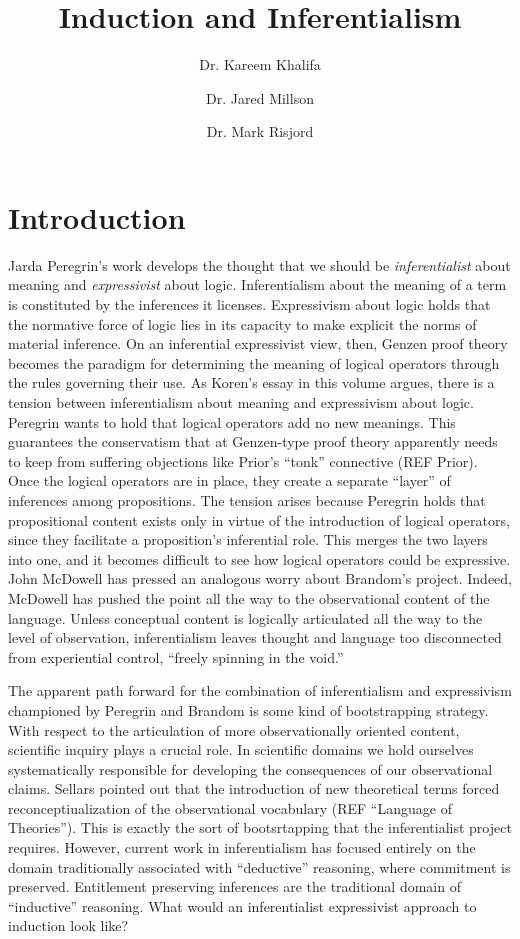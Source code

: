 \documentclass{article}                     %
\title{Induction and Inferentialism}
\author{							
	Dr. Kareem Khalifa  \and
	Dr. Jared Millson   \and
	Dr. Mark Risjord
	}
\date{}
\begin{document}
\maketitle
\large
\doublespacing   %

\section{Introduction}

Jarda Peregrin's work develops the thought that we should be \textit{inferentialist} about meaning and \textit{expressivist} about logic.  Inferentialism about the meaning of a term is constituted by the inferences it licenses.  Expressivism about logic holds that the normative force of logic lies in its capacity to make explicit the norms of material inference. On an inferential expressivist view, then, Genzen proof theory becomes the paradigm for determining the meaning of logical operators through the rules governing their use.  As Koren's essay in this volume argues, there is a tension between inferentialism about meaning and expressivism about logic.  Peregrin wants to hold that logical operators add no new meanings.  This guarantees the conservatism that at Genzen-type proof theory apparently needs to keep from suffering objections like Prior's ``tonk'' connective (REF Prior).   Once the logical operators are in place, they create a separate ``layer'' of inferences among propositions.  The tension arises because Peregrin holds that propositional content exists only in virtue of the introduction of logical operators, since they facilitate a proposition's inferential role.  This merges the two layers into one, and it becomes difficult to see how logical operators could be expressive.  John McDowell has pressed an analogous worry about Brandom's project.  Indeed, McDowell has pushed the point all the way to the observational content of the language.  Unless conceptual content is logically articulated all the way to the level of observation, inferentialism leaves  thought and language too disconnected from experiential control, ``freely spinning in the void.''  
 
 The apparent path forward for the combination of inferentialism and expressivism championed by Peregrin and Brandom is some kind of bootstrapping strategy.  With respect to the articulation of more observationally oriented content, scientific inquiry plays a crucial role. In scientific domains we hold ourselves systematically responsible for developing the consequences of our observational claims.   Sellars pointed out that the introduction of new theoretical terms forced reconceptiualization of the observational vocabulary  (REF ``Language of Theories'').  This is exactly the sort of bootsrtapping that the inferentialist project requires.  However, current work in inferentialism has focused entirely on the domain traditionally associated with ``deductive'' reasoning, where commitment is preserved. Entitlement preserving inferences are the traditional domain of ``inductive'' reasoning.  What would an inferentialist expressivist approach to induction look like? 
\end{document}
